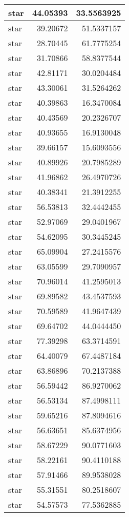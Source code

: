 \documentclass[
]{book}
\theoremstyle{definition}
\theoremstyle{definition}
\theoremstyle{definition}
\theoremstyle{definition}
\theoremstyle{remark}
\begin{document}
\begin{tabular}{l|r|r}
\hline
star & 44.05393 & 33.5563925\\
\hline
star & 39.20672 & 51.5337157\\
\hline
star & 28.70445 & 61.7775254\\
\hline
star & 31.70866 & 58.8377544\\
\hline
star & 42.81171 & 30.0204484\\
\hline
star & 43.30061 & 31.5264262\\
\hline
star & 40.39863 & 16.3470084\\
\hline
star & 40.43569 & 20.2326707\\
\hline
star & 40.93655 & 16.9130048\\
\hline
star & 39.66157 & 15.6093556\\
\hline
star & 40.89926 & 20.7985289\\
\hline
star & 41.96862 & 26.4970726\\
\hline
star & 40.38341 & 21.3912255\\
\hline
star & 56.53813 & 32.4442455\\
\hline
star & 52.97069 & 29.0401967\\
\hline
star & 54.62095 & 30.3445245\\
\hline
star & 65.09904 & 27.2415576\\
\hline
star & 63.05599 & 29.7090957\\
\hline
star & 70.96014 & 41.2595013\\
\hline
star & 69.89582 & 43.4537593\\
\hline
star & 70.59589 & 41.9647439\\
\hline
star & 69.64702 & 44.0444450\\
\hline
star & 77.39298 & 63.3714591\\
\hline
star & 64.40079 & 67.4487184\\
\hline
star & 63.86896 & 70.2137388\\
\hline
star & 56.59442 & 86.9270062\\
\hline
star & 56.53134 & 87.4998111\\
\hline
star & 59.65216 & 87.8094616\\
\hline
star & 56.63651 & 85.6374956\\
\hline
star & 58.67229 & 90.0771603\\
\hline
star & 58.22161 & 90.4110188\\
\hline
star & 57.91466 & 89.9538028\\
\hline
star & 55.31551 & 80.2518607\\
\hline
star & 54.57573 & 77.5362885\\

\end{tabular}
\end{document}
